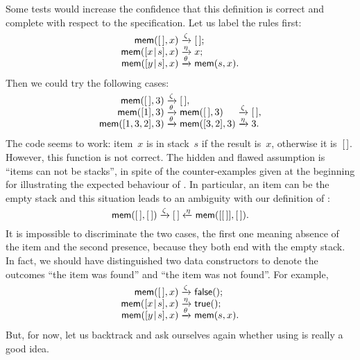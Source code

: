 Some tests would increase the confidence that this definition is
correct and complete with respect
to the specification. Let us label the rules first:
\begin{equation*}
\begin{array}{r@{\;}c@{\;}l}
\fun{mem}(\el,x)         & \smashedrightarrow{\zeta}  & \el;\\
\fun{mem}(\cons{x}{s},x) & \smashedrightarrow{\eta}   & x;\\
\fun{mem}(\cons{y}{s},x) & \smashedrightarrow{\theta} &
\fun{mem}(s,x).
\end{array}
\end{equation*}
Then we could try the following cases:
\begin{equation*}
\begin{array}{r@{\;}l@{\;}l@{\;}l@{\;}l}
\fun{mem}(\el,3) & \smashedrightarrow{\zeta} & \el,\\
\fun{mem}([1],3) & \smashedrightarrow{\theta} & \fun{mem}(\el,3)
& \smashedrightarrow{\zeta} & \el,\\
\fun{mem}([1,3,2],3) & \smashedrightarrow{\theta} & \fun{mem}([3,2],3)
& \smashedrightarrow{\eta} & 3.
\end{array}
\end{equation*}
The code seems to work: item~\(x\) is in stack~\(s\) if the result
is~\(x\), otherwise it is~\([\,]\). However, this function is not
correct. The hidden and flawed assumption is ``items
can not be stacks'', in spite of the counter\hyp{}examples given at
the beginning for illustrating the expected behaviour of
. In particular, an item can be the empty stack and this
situation leads to an ambiguity with our definition of :
\begin{equation*}
  \textsf{mem}([\,],[\,]) \xrightarrow{\smash{\zeta}} [\,] \xleftarrow{\smash{\eta}} \textsf{mem}([[\,]],[\,]).
\end{equation*}
It is impossible to discriminate the two cases, the first one meaning
absence of the item and the second presence, because they both end
with the empty stack. In fact, we should have distinguished two data
constructors to denote the outcomes ``the item was found'' and ``the
item was not found''. For example,
\begin{equation*}
\begin{array}{r@{\;}l@{\;}l}
\fun{mem}(\el,x)         & \smashedrightarrow{\zeta}  & \fun{false}();\\
\fun{mem}(\cons{x}{s},x) & \smashedrightarrow{\eta}   & \fun{true}();\\
\fun{mem}(\cons{y}{s},x) & \smashedrightarrow{\theta} & \fun{mem}(s,x).
\end{array}
\end{equation*}
But, for now, let us backtrack and ask ourselves again whether using
 is really a good idea.

